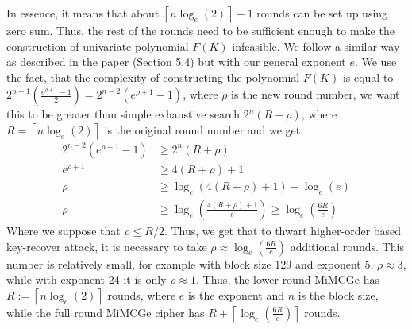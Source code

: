 \documentclass{Resources/UoBLab1}
\theoremstyle{definition}
\begin{document}
In essence, it means that about \(\left\lceil n\log_e(2) \right\rceil - 1\) rounds can be set up using zero sum. Thus, the rest of the rounds need to be sufficient enough to make the construction of univariate polynomial $F(K)$ infeasible. We follow a similar way as described in the paper (Section 5.4\cite{MiMCAttack}) but with our general exponent $e$. We use the fact, that the complexity of constructing the polynomial $F(K)$ is equal to \(2^{n-1}(\frac{e^{\rho + 1}-1}{2}) = 2^{n-2}(e^{\rho + 1}-1)\), where $\rho$ is the new round number, we want this to be greater than simple exhaustive search \(2^n(R+\rho)\), where \(R = \left\lceil n\log_e(2) \right\rceil \) is the original round number and we get:
\begin{align*}
    2^{n-2}(e^{\rho + 1}-1) &\ge 2^n(R +\rho)\\
    e^{\rho + 1} &\ge 4(R +\rho) + 1\\
    \rho &\ge \log_e(4(R+\rho) + 1) - \log_e(e)\\
    \rho &\ge \log_e\left(\frac{4(R+\rho) + 1}{e}\right) \ge \log_e\left(\frac{6R}{e}\right)
\end{align*}
Where we suppose that \(\rho \le R/2\). Thus, we get that to thwart higher-order based key-recover attack, it is necessary to take \(\rho \approx \log_e(\frac{6R}{e})\) additional rounds. This number is relatively small, for example with block size 129 and exponent 5, $\rho \approx 3$, while with exponent 24 it is only $\rho \approx 1$. Thus, the lower round MiMCGe has \(R := \left\lceil n\log_e(2) \right\rceil\) rounds, where $e$ is the exponent and $n$ is the block size, while the full round MiMCGe cipher has \(R + \left\lceil \log_e(\frac{6R}{e}) \right\rceil\) rounds.
\end{document}
